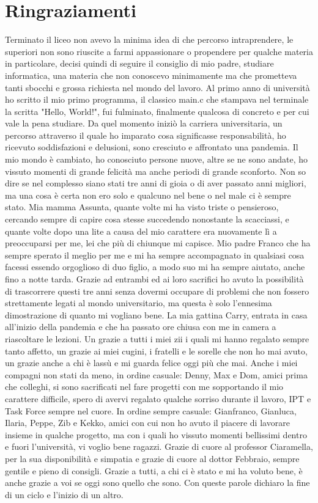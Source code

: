 \chapter*{Ringraziamenti}
Terminato il liceo non avevo la minima idea di che percorso intraprendere, le superiori non sono riuscite a farmi appassionare o propendere per qualche materia in particolare, decisi quindi di seguire il consiglio di mio padre, studiare informatica, una materia che non conoscevo minimamente ma che prometteva tanti sbocchi e grossa richiesta nel mondo del lavoro. Al primo anno di università ho scritto il mio primo programma, il classico main.c che stampava nel terminale la scritta "Hello, World!", fui fulminato, finalmente qualcosa di concreto e per cui vale la pena studiare. Da quel momento iniziò la carriera universitaria, un percorso attraverso il quale ho imparato cosa significasse responsabilità, ho ricevuto soddisfazioni e delusioni, sono cresciuto e affrontato una pandemia. Il mio mondo è cambiato, ho conosciuto persone nuove, altre se ne sono andate, ho vissuto momenti di grande felicità ma anche periodi di grande sconforto. Non so dire se nel complesso siano stati tre anni di gioia o di aver passato anni migliori, ma una cosa è certa non ero solo e qualcuno nel bene o nel male ci è sempre stato.\newline
Mia mamma Assunta, quante volte mi ha visto triste o pensieroso, cercando sempre di capire cosa stesse succedendo nonostante la scacciassi, e quante volte dopo una lite a causa del mio carattere era nuovamente lì a preoccuparsi per me, lei che più di chiunque mi capisce. Mio padre Franco che ha sempre sperato il meglio per me e mi ha sempre accompagnato in qualsiasi cosa facessi essendo orgoglioso di duo figlio, a modo suo mi ha sempre aiutato, anche fino a notte tarda. Grazie ad entrambi ed ai loro sacrifici ho avuto la possibilità di trascorrere questi tre anni senza dovermi occupare di problemi che non fossero strettamente legati al mondo universitario, ma questa è solo l'ennesima dimostrazione di quanto mi vogliano bene. La mia gattina Carry, entrata in casa all'inizio della pandemia e che ha passato ore chiusa con me in camera a riascoltare le lezioni. Un grazie a tutti i miei zii i quali mi hanno regalato sempre tanto affetto, un grazie ai miei cugini, i fratelli e le sorelle che non ho mai avuto, un grazie anche a chi è lassù e mi guarda felice oggi più che mai.\newline
Anche i miei compagni non stati da meno, in ordine casuale: Denny, Max e Dom, amici prima che colleghi, si sono sacrificati nel fare progetti con me sopportando il mio carattere difficile, spero di avervi regalato qualche sorriso durante il lavoro, IPT e Task Force sempre nel cuore. In ordine sempre casuale: Gianfranco, Gianluca, Ilaria, Peppe, Zib e Kekko, amici con cui non ho avuto il piacere di lavorare insieme in qualche progetto, ma con i quali ho vissuto momenti bellissimi dentro e fuori l'università, vi voglio bene ragazzi. Grazie  di cuore al professor Ciaramella, per la sua disponibilità e simpatia e grazie di cuore al dottor Febbraio, sempre gentile e pieno di consigli. Grazie a tutti, a chi ci è stato e mi ha voluto bene, è anche grazie a voi se oggi sono quello che sono.\newline
Con queste parole dichiaro la fine di un ciclo e l'inizio di un altro.